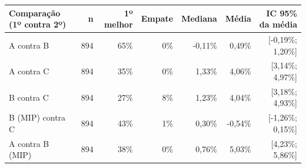 \begin{tabular}{lrrrrrr}
\toprule
Comparação (1º contra 2º) & n & 1º melhor & Empate & Mediana & Média & IC 95\% da média \\
\midrule
A contra B & 894 & 65\% & 0\% & -0,11\% & 0,49\% & [-0,19\%; 1,20\%] \\
A contra C & 894 & 35\% & 0\% & 1,33\% & 4,06\% & [3,14\%; 4,97\%] \\
B contra C & 894 & 27\% & 8\% & 1,23\% & 4,04\% & [3,18\%; 4,93\%] \\
B (MIP) contra C & 894 & 43\% & 1\% & 0,30\% & -0,54\% & [-1,26\%; 0,15\%] \\
A contra B (MIP) & 894 & 38\% & 0\% & 0,76\% & 5,03\% & [4,23\%; 5,86\%] \\
\bottomrule
\end{tabular}
